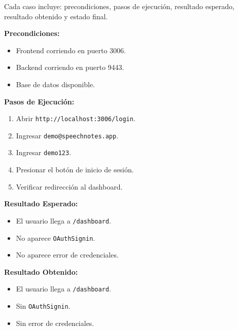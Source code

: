 \documentclass[12pt, a4paper]{article}
\newcommand{\prioChip}[2]{%
  \colorbox{#1}{\textcolor{white}{\footnotesize\textbf{#2}}}%
}
\newcommand{\statusChip}[2]{%
  \colorbox{#1}{\textcolor{white}{\footnotesize\textbf{#2}}}%
}
\begin{document}
Cada caso incluye: precondiciones, pasos de ejecuci\'on, resultado esperado, resultado
obtenido y estado final.

\begin{tcolorbox}[enhanced, breakable, colback=white, colframe=espe-blue,
  boxrule=1pt, arc=5pt,
  title={\textbf{CP-01} \enspace Login con usuario demo \hfill \prioChip{alta}{Alta} \enspace \statusChip{paso-green}{PASO}},
  fonttitle=\color{white},
  attach boxed title to top left={yshift=-2mm,xshift=4mm},
  boxed title style={colback=espe-blue,arc=3pt}]
\begin{minipage}[t]{0.48\linewidth}
\textbf{Precondiciones:}
\begin{itemize}[noitemsep,topsep=2pt]
  \item Frontend corriendo en puerto 3006.
  \item Backend corriendo en puerto 9443.
  \item Base de datos disponible.
\end{itemize}
\textbf{Pasos de Ejecuci\'on:}
\begin{enumerate}[noitemsep,topsep=2pt]
  \item Abrir \texttt{http://localhost:3006/login}.
  \item Ingresar \texttt{demo@speechnotes.app}.
  \item Ingresar \texttt{demo123}.
  \item Presionar el bot\'on de inicio de sesi\'on.
  \item Verificar redirecci\'on al dashboard.
\end{enumerate}
\end{minipage}\hfill
\begin{minipage}[t]{0.48\linewidth}
\textbf{Resultado Esperado:}
\begin{itemize}[noitemsep,topsep=2pt]
  \item El usuario llega a \texttt{/dashboard}.
  \item No aparece \texttt{OAuthSignin}.
  \item No aparece error de credenciales.
\end{itemize}
\vspace{4pt}
\textbf{Resultado Obtenido:}
\begin{itemize}[noitemsep,topsep=2pt]
  \item[$\checkmark$] El usuario llega a \texttt{/dashboard}.
  \item[$\checkmark$] Sin \texttt{OAuthSignin}.
  \item[$\checkmark$] Sin error de credenciales.
\end{itemize}
\end{minipage}
\end{tcolorbox}
\end{document}
